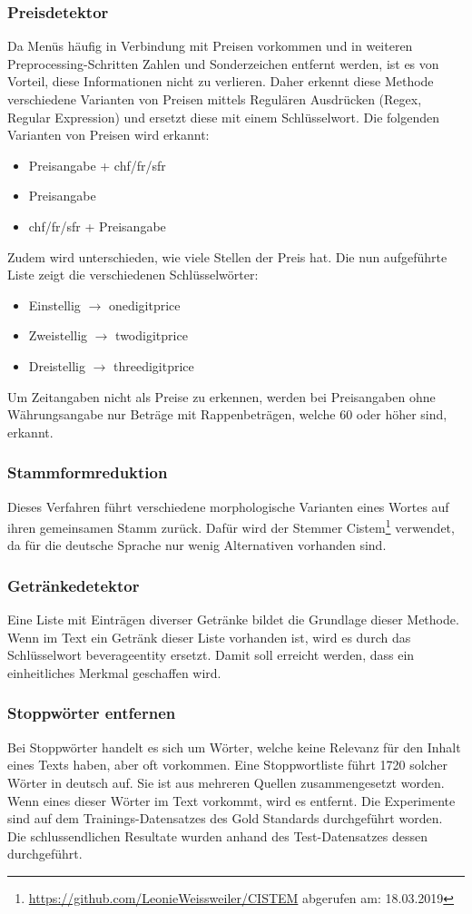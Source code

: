 \subsubsection{Preisdetektor}
Da Menüs häufig in Verbindung mit Preisen vorkommen und in weiteren Preprocessing-Schritten Zahlen und Sonderzeichen entfernt werden, ist es von Vorteil, diese Informationen nicht zu verlieren.
Daher erkennt diese Methode verschiedene Varianten von Preisen mittels Regulären Ausdrücken (Regex, Regular Expression) und ersetzt diese mit einem Schlüsselwort.
Die folgenden Varianten von Preisen wird erkannt:
\begin{itemize}
	\item Preisangabe + chf/fr/sfr
	\item Preisangabe
	\item chf/fr/sfr + Preisangabe
\end{itemize} 
Zudem wird unterschieden, wie viele Stellen der Preis hat.
Die nun aufgeführte Liste zeigt die verschiedenen Schlüsselwörter:
\begin{itemize}
	\item Einstellig $\rightarrow$ onedigitprice
	\item Zweistellig $\rightarrow$ twodigitprice
	\item Dreistellig $\rightarrow$ threedigitprice
\end{itemize} 
Um Zeitangaben nicht als Preise zu erkennen, werden bei Preisangaben ohne Währungsangabe nur Beträge mit Rappenbeträgen, welche 60 oder höher sind, erkannt.
\subsubsection{Stammformreduktion}
Dieses Verfahren führt verschiedene morphologische Varianten eines Wortes auf ihren gemeinsamen Stamm zurück.
Dafür wird der Stemmer \glqq Cistem\footnote{\url{https://github.com/LeonieWeissweiler/CISTEM} abgerufen am: 18.03.2019}\grqq{} verwendet, da für die deutsche Sprache nur wenig Alternativen vorhanden sind. 
\subsubsection{Getränkedetektor}
Eine Liste mit Einträgen diverser Getränke bildet die Grundlage dieser Methode.
Wenn im Text ein Getränk dieser Liste vorhanden ist, wird es durch das Schlüsselwort \glqq beverageentity\grqq{} ersetzt.
Damit soll erreicht werden, dass ein einheitliches Merkmal geschaffen wird.
\subsubsection{Stoppwörter entfernen}
Bei Stoppwörter handelt es sich um Wörter, welche keine Relevanz für den Inhalt eines Texts haben, aber oft vorkommen.
Eine Stoppwortliste führt 1720 solcher Wörter in deutsch auf. Sie ist aus mehreren Quellen zusammengesetzt worden.
Wenn eines dieser Wörter im Text vorkommt, wird es entfernt.
Die Experimente sind auf dem Trainings-Datensatzes des Gold Standards durchgeführt worden.
Die schlussendlichen Resultate wurden anhand des Test-Datensatzes dessen durchgeführt.
